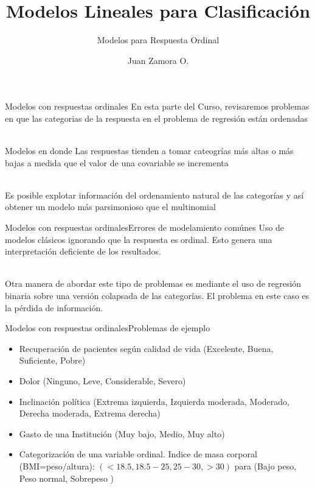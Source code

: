 \documentclass[]{beamer}
\title{Modelos Lineales para Clasificación}
\subtitle{Modelos para Respuesta Ordinal}
\author{Juan Zamora O.}
\date{}
\begin{document}
\begin{frame}
    \titlepage
\end{frame}

\begin{frame}{Modelos con respuestas ordinales}
	En esta parte del Curso, revisaremos problemas en que las categorias 
	de la respuesta en el problema de regresión están ordenadas\\~\ 
	
	Modelos en donde 
	Las respuestas tienden a tomar cateogrías más altas o más bajas a 
	medida que el valor de una covariable se incrementa\\~\

	Es posible explotar información del ordenamiento natural de las 
	categorías y así obtener un modelo más parsimonioso que el multinomial
\end{frame}

\begin{frame}{Modelos con respuestas ordinales}{Errores de modelamiento comúnes }
	Uso de modelos clásicos ignorando que la respuesta es ordinal. Esto genera 
	una interpretación deficiente de los resultados.\\~\ 

	Otra manera de abordar este tipo de problemas es mediante el uso de 
	regresión binaria sobre una versión colapsada de las categorías. El 
	problema en este caso es la pérdida de información.

\end{frame}

\begin{frame}{Modelos con respuestas ordinales}{Problemas de ejemplo }
	\begin{itemize}
		\item Recuperación de pacientes según calidad de vida (Excelente, Buena, Suficiente, Pobre)
		\item Dolor (Ninguno, Leve, Considerable, Severo)
		\item Inclinación política (Extrema izquierda, Izquierda moderada, Moderado, Derecha moderada, Extrema derecha)
		\item Gasto de una Institución (Muy bajo, Medio, Muy alto)
		\item Categorización de una variable ordinal. Indice de masa corporal (BMI=peso/altura): $(<18.5, 18.5-25,25-30,>30)$ para (Bajo peso, Peso normal, Sobrepeso )
	\end{itemize}

\end{frame}
\end{document}
